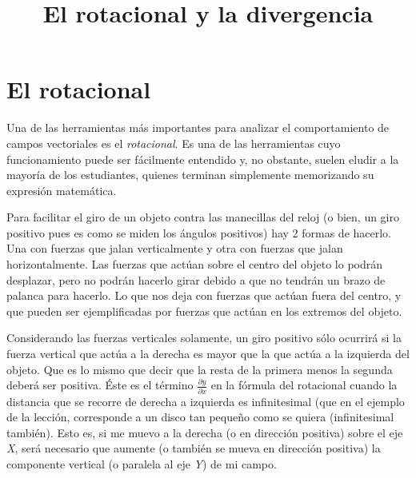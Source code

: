 \documentclass{article}
\begin{document}
\title{El rotacional y la divergencia}
\date{}
\maketitle



\section{El rotacional}

Una de las herramientas más importantes para analizar el comportamiento de campos vectoriales es el \emph{rotacional}. Es una de las herramientas cuyo funcionamiento puede ser fácilmente entendido y, no obstante, suelen eludir a la mayoría de los estudiantes, quienes terminan simplemente memorizando su expresión matemática.\bigskip

Para facilitar el giro de un objeto contra las manecillas del reloj (o bien, un giro positivo pues es como se miden los ángulos positivos) hay 2 formas de hacerlo. Una con fuerzas que jalan verticalmente y otra con fuerzas que jalan horizontalmente. Las fuerzas que actúan sobre el centro del objeto lo podrán desplazar, pero no podrán hacerlo girar debido a que no tendrán un brazo de palanca para hacerlo. Lo que nos deja con fuerzas que actúan fuera del centro, y que pueden ser ejemplificadas por fuerzas que actúan en los extremos del objeto.\bigskip

Considerando las fuerzas verticales solamente, un giro positivo sólo ocurrirá si la fuerza vertical que actúa a la derecha es mayor que la que actúa a la izquierda del objeto. Que es lo mismo que decir que la resta de la primera menos la segunda deberá ser positiva. Éste es el término $\frac{\partial y}{\partial x}$ en la fórmula del rotacional cuando la distancia que se recorre de derecha a izquierda es infinitesimal (que en el ejemplo de la lección, corresponde a un disco tan pequeño como se quiera (infinitesimal también). Esto es, si me muevo a la derecha (o en dirección positiva) sobre el eje \emph{X}, será necesario que aumente (o también se mueva en dirección positiva) la componente vertical (o paralela al eje \emph{Y}) de mi campo.\bigskip
\end{document}
